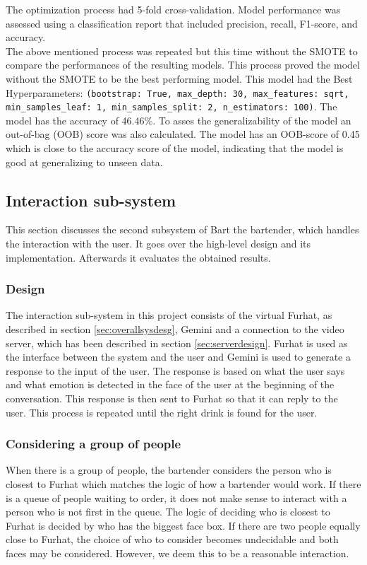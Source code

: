 \documentclass[conference]{IEEEtran}
\begin{document}
The optimization process had 5-fold cross-validation.
Model performance was assessed using a classification report that included precision, recall, F1-score, and accuracy.
\\The above mentioned process was repeated but this time without the SMOTE to compare the performances of the resulting models. This process proved the model without the SMOTE to be the best performing model. This model had the Best Hyperparameters: 
\texttt{(bootstrap: True, max\_depth: 30, max\_features: sqrt, min\_samples\_leaf: 1, min\_samples\_split: 2, n\_estimators: 100)}. The model has the accuracy of 46.46\%. To asses the generalizability of the model an out-of-bag (OOB) score was also calculated. The model has an OOB-score of 0.45 which is close to the accuracy score of the model, indicating that the model is good at generalizing to unseen data\cite{OOB}.\\

\subsection{Interaction sub-system} %
This section discusses the second subsystem of Bart the bartender, which handles the interaction with the user. 
It goes over the high-level design and its implementation. 
Afterwards it evaluates the obtained results.

\subsubsection{Design}
The interaction sub-system in this project consists of the virtual Furhat, as described in section \ref{sec:overallsysdesg}, Gemini and a connection to the video server, which has been described in section \ref{sec:serverdesign}.
Furhat is used as the interface between the system and the user and Gemini is used to generate a response to the input of the user.
The response is based on what the user says and what emotion is detected in the face of the user at the beginning of the conversation.
This response is then sent to Furhat so that it can reply to the user.
This process is repeated until the right drink is found for the user.

\subsubsection{Considering a group of people}
When there is a group of people, the bartender considers the person who is closest to Furhat which matches the logic of how a bartender would work. If there is a queue of people waiting to order, it does not make sense to interact with a person who is not first in the queue. The logic of deciding who is closest to Furhat is decided by who has the biggest face box. If there are two people equally close to Furhat, the choice of who to consider becomes undecidable and both faces may be considered. However, we deem this to be a reasonable interaction.
\end{document}
